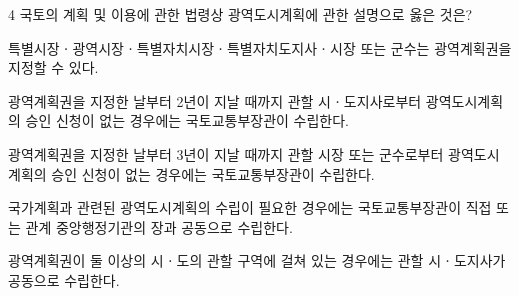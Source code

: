 \begin{question}{4}
국토의 계획 및 이용에 관한 법령상 광역도시계획에 관한 설명으로 옳은 것은?
\begin{choices}
  \item 특별시장ㆍ광역시장ㆍ특별자치시장ㆍ특별자치도지사ㆍ시장 또는 군수는 광역계획권을 지정할 수 있다.
  \item 광역계획권을 지정한 날부터 2년이 지날 때까지 관할 시ㆍ도지사로부터 광역도시계획의 승인 신청이 없는 경우에는 국토교통부장관이 수립한다.
  \item 광역계획권을 지정한 날부터 3년이 지날 때까지 관할 시장 또는 군수로부터 광역도시계획의 승인 신청이 없는 경우에는 국토교통부장관이 수립한다.
  \item 국가계획과 관련된 광역도시계획의 수립이 필요한 경우에는 국토교통부장관이 직접 또는 관계 중앙행정기관의 장과 공동으로 수립한다.
  \item 광역계획권이 둘 이상의 시ㆍ도의 관할 구역에 걸쳐 있는 경우에는 관할 시ㆍ도지사가 공동으로 수립한다.
\end{choices}
\end{question}
